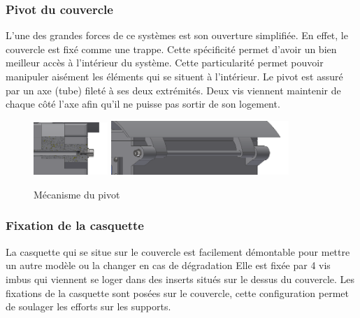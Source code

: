 \subsubsection{Pivot du couvercle}

L’une des grandes forces de ce systèmes est son ouverture simplifiée. En effet, le couvercle est fixé 
comme une trappe. Cette spécificité permet d’avoir un bien meilleur accès à l’intérieur du système. 
Cette particularité permet pouvoir manipuler aisément les éléments qui se situent à l’intérieur. Le 
pivot est assuré par un axe (tube) fileté à ses deux extrémités. Deux vis viennent maintenir de chaque 
côté l’axe afin qu’il ne puisse pas sortir de son logement.

\begin{figure}[H]
    \centering
    \includegraphics[width=0.25\textwidth]{Images/photos_PGA/pivotcoupe.PNG}
    \includegraphics[width=0.6\textwidth]{Images/photos_PGA/pivotnormal.PNG}
    \caption{Mécanisme du pivot}
    \label{fig:pivot}
\end{figure}

\subsubsection{Fixation de la casquette}

La casquette qui se situe sur le couvercle est facilement démontable pour mettre un autre modèle ou 
la changer en cas de dégradation Elle est fixée par 4 vis imbus qui viennent se loger dans des inserts 
situés sur le dessus du couvercle. Les fixations de la casquette sont posées sur le couvercle, cette 
configuration permet de soulager les efforts sur les supports.

